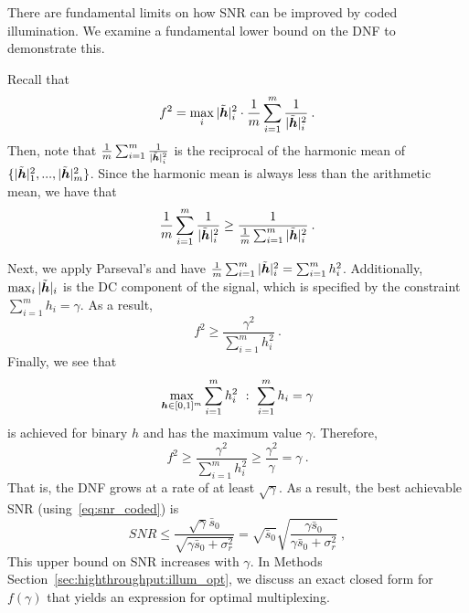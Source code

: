 There are fundamental limits on how SNR can be improved by coded illumination.
We examine a fundamental lower bound on the DNF to demonstrate this.

Recall that
\[f^2 = \max_i |\tilde {\bm{h}}|_i^2\cdot \frac{1}{m} \sum_{i=1}^m \frac{1}{|\tilde {\bm{h}}|_i^2}\:.\]
Then, note that $\frac{1}{m} \sum_{i=1}^m \frac{1}{|\tilde {\bm{h}}|_i^2}$ is the reciprocal of the {harmonic mean} of $\{|\tilde {\bm{h}}|_1^2,...,|\tilde {\bm{h}}|_m^2\}$. Since the harmonic mean is always less than the {arithmetic mean}, we have that
$$ \frac{1}{m} \sum_{i=1}^m \frac{1}{|\tilde {\bm{h}}|_i^2}\geq \frac{1}{\frac{1}{m}\sum_{i=1}^m |\tilde {\bm{h}}|_i^2}\:. $$

Next, we apply Parseval's and have $\frac{1}{m}\sum_{i=1}^m |\tilde {\bm{h}}|_i^2 = \sum_{i=1}^m h_i^2$.
Additionally, $\max_i |\tilde {\bm{h}}|_i$ is the DC component of the signal, which is specified by the constraint $\sum_{i=1}^m h_i = \gamma$.
As a result, $$ f^2 \geq \frac{\gamma^2}{\sum_{i=1}^m h_i^2}\:.$$
Finally, we see that
$$\max_{\bm{h}\in[0,1]^m} \sum_{i=1}^m h_i^2~:~ \sum_{i=1}^m h_i=\gamma$$
is achieved for binary $h$ and has the maximum value $\gamma$. Therefore,
\[f^2 \geq \frac{\gamma^2}{\sum_{i=1}^m h_i^2} \geq \frac{\gamma^2}{\gamma} = \gamma\:.\]
That is, the DNF grows at a rate of at least $\sqrt{\gamma}$. As a result,  the best achievable SNR (using~\eqref{eq:snr_coded}) is
$$ SNR  \leq \frac{\sqrt{\gamma}\bar{s}_0}{\sqrt{\gamma\bar{s}_0 + \sigma^2_{r}}}
=\sqrt{\bar{s}_0}\sqrt{\frac{\gamma \bar{s}_0 }{\gamma\bar{s}_0 + \sigma^2_{r}}}\:,
$$
This upper bound on SNR increases with ${\gamma}$.
In Methods Section~\ref{sec:highthroughput:illum_opt}, we discuss an exact closed form for $f(\gamma)$ that yields an expression for optimal multiplexing.

